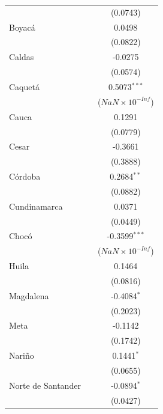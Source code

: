 \begin{tabular}{lcc}
                      &                & (0.0743)\\   
   Boyacá             &                & 0.0498\\   
                      &                & (0.0822)\\   
   Caldas             &                & -0.0275\\   
                      &                & (0.0574)\\   
   Caquetá            &                & 0.5073$^{***}$\\   
                      &                & ($NaN\times 10^{-Inf}$)\\    
   Cauca              &                & 0.1291\\   
                      &                & (0.0779)\\   
   Cesar              &                & -0.3661\\   
                      &                & (0.3888)\\   
   Córdoba            &                & 0.2684$^{**}$\\   
                      &                & (0.0882)\\   
   Cundinamarca       &                & 0.0371\\   
                      &                & (0.0449)\\   
   Chocó              &                & -0.3599$^{***}$\\   
                      &                & ($NaN\times 10^{-Inf}$)\\    
   Huila              &                & 0.1464\\   
                      &                & (0.0816)\\   
   Magdalena          &                & -0.4084$^{*}$\\   
                      &                & (0.2023)\\   
   Meta               &                & -0.1142\\   
                      &                & (0.1742)\\   
   Nariño             &                & 0.1441$^{*}$\\   
                      &                & (0.0655)\\   
   Norte de Santander &                & -0.0894$^{*}$\\   
                      &                & (0.0427)\\   

\end{tabular}

